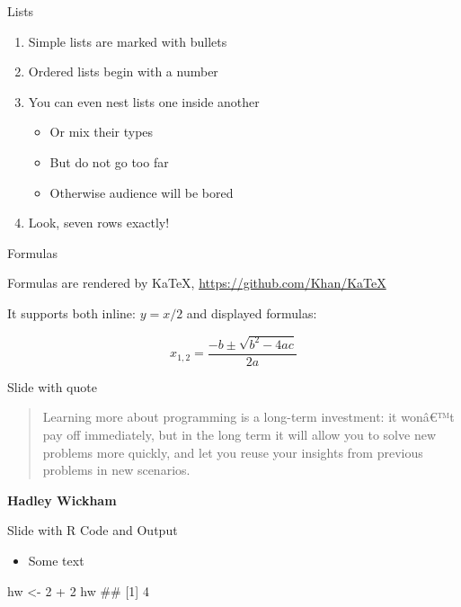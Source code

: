 \documentclass[ignorenonframetext,]{beamer}
\newenvironment{Shaded}{}{}
\newcommand{\CommentTok}[1]{\textcolor[rgb]{0.00,0.50,0.00}{#1}}
\newcommand{\DecValTok}[1]{#1}
\newcommand{\NormalTok}[1]{#1}
\newcommand{\OperatorTok}[1]{#1}
\newcommand{\StringTok}[1]{\textcolor[rgb]{0.00,0.50,0.50}{#1}}
\providecommand{\tightlist}{%
  \setlength{\itemsep}{0pt}\setlength{\parskip}{0pt}}
\begin{document}
\begin{frame}{Lists}
\protect\hypertarget{lists}{}

\begin{enumerate}
\tightlist
\item
  Simple lists are marked with bullets
\item
  Ordered lists begin with a number
\item
  You can even nest lists one inside another

  \begin{itemize}
  \tightlist
  \item
    Or mix their types
  \item
    But do not go too far
  \item
    Otherwise audience will be bored
  \end{itemize}
\item
  Look, seven rows exactly!
\end{enumerate}

\end{frame}

\begin{frame}{Formulas}
\protect\hypertarget{formulas}{}

Formulas are rendered by KaTeX, \url{https://github.com/Khan/KaTeX}

It supports both inline: \(y = x / 2\) and displayed formulas:

\[ x_{1,2} = \frac{- b \pm \sqrt{b^2 - 4ac}}{2a} \]

\end{frame}

\begin{frame}{Slide with quote}
\protect\hypertarget{slide-with-quote}{}

\begin{quote}
Learning more about programming is a long-term investment: it wonâ€™t
pay off immediately, but in the long term it will allow you to solve new
problems more quickly, and let you reuse your insights from previous
problems in new scenarios.
\end{quote}

\textbf{Hadley Wickham}

\end{frame}

\begin{frame}[fragile]{Slide with R Code and Output}
\protect\hypertarget{slide-with-r-code-and-output}{}

\begin{itemize}
\tightlist
\item
  Some text \scriptsize
\end{itemize}

\begin{Shaded}
\begin{Highlighting}[]
\NormalTok{hw <-}\StringTok{ }\DecValTok{2} \OperatorTok{+}\StringTok{ }\DecValTok{2}
\NormalTok{hw}
\CommentTok{## [1] 4}
\end{Highlighting}
\end{Shaded}

\end{frame}
\end{document}
